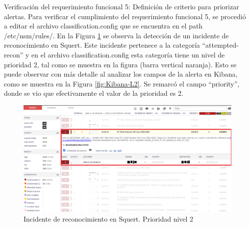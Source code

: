 \begin{section}{Verificación del requerimiento funcional 5: Definición de criterio para priorizar alertas.}
    Para verificar el cumplimiento del requerimiento funcional 5, se procedió a editar el archivo  classification.config que se encuentra en el path /etc/nsm/rules/. En la Figura \ref{fig:squert-L2} se observa la detección de un incidente de reconocimiento en Squert. Este incidente pertenece a la categoría “attempted-recon” y en el archivo classification.config esta categoría tiene un nivel de prioridad 2, tal como se muestra en la figura (barra vertical naranja). Esto se puede observar con más detalle al analizar los campos de la alerta en Kibana, como se muestra en la Figura \ref{fig:Kibana-L2}. Se remarcó el campo “priority”, donde se vio que efectivamente el valor de la prioridad es 2.
    \begin{figure}[H]
        \centering
        \includegraphics[width=1\textwidth]{./iteracion_3_imagenes/squert_ataque_vnc_L2-EDITADO.png}
        \caption{Incidente de reconocimiento en Squert. Prioridad nivel 2}
        \label{fig:squert-L2}
    \end{figure}
    \begin{figure}[H]
        \centering

\end{figure}
\end{section}
